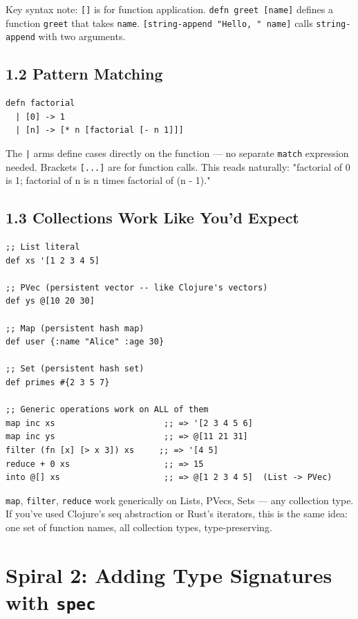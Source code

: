 \documentclass[11pt]{article}
\begin{document}
Key syntax note: \texttt{[]} is for function application. \texttt{defn greet [name]}
defines a function \texttt{greet} that takes \texttt{name}. \texttt{[string-append "Hello, " name]}
calls \texttt{string-append} with two arguments.
\subsection{1.2 Pattern Matching}
\label{sec:org8844493}

\begin{verbatim}
defn factorial
  | [0] -> 1
  | [n] -> [* n [factorial [- n 1]]]
\end{verbatim}

The \texttt{|} arms define cases directly on the function — no separate
\texttt{match} expression needed. Brackets \texttt{[...]} are for function calls.
This reads naturally: "factorial of 0 is 1; factorial of n is n times
factorial of (n - 1)."
\subsection{1.3 Collections Work Like You'd Expect}
\label{sec:orgb71ab58}

\begin{verbatim}
;; List literal
def xs '[1 2 3 4 5]

;; PVec (persistent vector -- like Clojure's vectors)
def ys @[10 20 30]

;; Map (persistent hash map)
def user {:name "Alice" :age 30}

;; Set (persistent hash set)
def primes #{2 3 5 7}

;; Generic operations work on ALL of them
map inc xs                      ;; => '[2 3 4 5 6]
map inc ys                      ;; => @[11 21 31]
filter (fn [x] [> x 3]) xs     ;; => '[4 5]
reduce + 0 xs                   ;; => 15
into @[] xs                     ;; => @[1 2 3 4 5]  (List -> PVec)
\end{verbatim}

\texttt{map}, \texttt{filter}, \texttt{reduce} work generically on Lists, PVecs, Sets ---
any collection type. If you've used Clojure's seq abstraction or
Rust's iterators, this is the same idea: one set of function names,
all collection types, type-preserving.
\section{Spiral 2: Adding Type Signatures with \texttt{spec}}
\label{sec:org35472c1}
\end{document}
